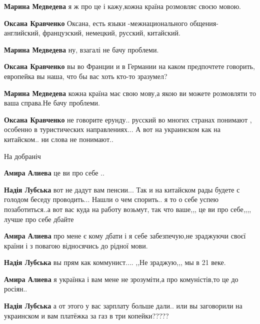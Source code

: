 \begin{itemize}
\begin{itemize}
\textbf{Марина Медведева} я ж про це і кажу,кожна країна розмовляє своєю мовою.

\textbf{Оксана Кравченко} Оксана, есть языки -межнационального общения- английский, французский, немецкий, русский, китайский.

\textbf{Марина Медведева} ну, взагалі не бачу проблеми.

\textbf{Оксана Кравченко} вы во Франции и в Германии на каком предпочтете говорить, европейка вы наша, что бы вас хоть кто-то зразумел?

\textbf{Марина Медведева} кожна країна має свою мову,а якою ви можете розмовляти то ваша справа.Не бачу проблеми.

\textbf{Оксана Кравченко} не говорите ерунду.. русский во многих странах понимают , особенно в туристических направлениях... А вот на украинском как на китайском.. ни слова не понимают..

На добраніч

\textbf{Амира Алиева} це ви про себе ..

\textbf{Надія Лубська} вот не дадут вам пенсии... Так и на китайском рады будете с голодом беседу проводить... Нашли о чем спорить.. я то о себе успею позаботиться..а вот вас куда на работу возьмут, так что ваше,,, це ви про себе,,,, лучше про себе дбайте

\textbf{Амира Алиева} про мене є кому дбати і я себе забезпечую,не зраджуючи своєї країни і з повагою відносячись до рідної мови.

\textbf{Надія Лубська} вы прям как коммунист.... ,,Не зраджую,,, мы в 21 веке.

\textbf{Амира Алиева} я українка і вам мене не зрозуміти,а про комуністів,то це до росіян..

\textbf{Надія Лубська} а от этого у вас зарплату больше дали.. или вы
заговорили на украинском и вам платёжка за газ в три копейки?????


\end{itemize}


\end{itemize}

